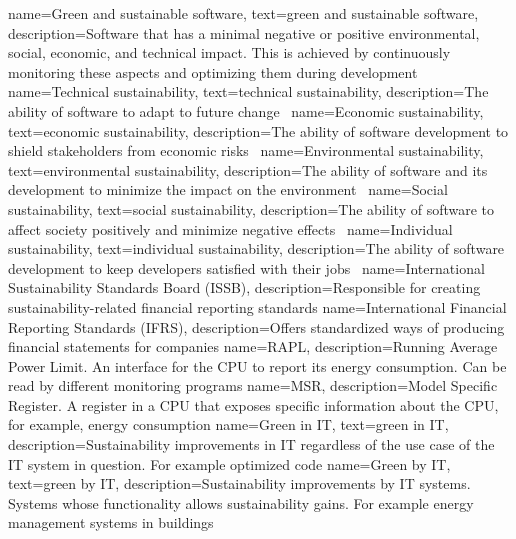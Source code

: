 {
    name=Green and sustainable software,
    text=green and sustainable software,
    description={Software that has a minimal negative or positive environmental, social, economic, and technical impact. This is achieved by continuously monitoring these aspects and optimizing them during development\cite{modelforselected}\cite{sustainabledevelopmentsustainablesoftware}}
}
{
    name=Technical sustainability,
    text=technical sustainability,
    description={The ability of software to adapt to future change~\cite{Calero2015}}
}
{
    name=Economic sustainability,
    text=economic sustainability,
    description={The ability of software development to shield stakeholders from economic risks~\cite{Calero2015}}
}
{
    name=Environmental sustainability,
    text=environmental sustainability,
    description={The ability of software and its development to minimize the impact on the environment~\cite{Calero2015}}
}
{
    name=Social sustainability,
    text=social sustainability,
    description={The ability of software to affect society positively and minimize negative effects~\cite{Calero2015}}
}
{
    name=Individual sustainability,
    text=individual sustainability,
    description={The ability of software development to keep developers satisfied with their jobs~\cite{Calero2015}}
}
{
    name=International Sustainability Standards Board (ISSB),
    description={Responsible for creating sustainability-related financial reporting standards}
}
{
    name=International Financial Reporting Standards (IFRS),
    description={Offers standardized ways of producing financial statements for companies}
}
{
    name=RAPL,
    description={Running Average Power Limit. An interface for the CPU to report its energy consumption. Can be read by different monitoring programs}
}
{
    name=MSR,
    description={Model Specific Register. A register in a CPU that exposes specific information about the CPU, for example, energy consumption}
}
{
    name=Green in IT,
    text=green in IT,
    description={Sustainability improvements in IT regardless of the use case of the IT system in question. For example optimized code}
}
{
    name=Green by IT,
    text=green by IT,
    description={Sustainability improvements by IT systems. Systems whose functionality allows sustainability gains. For example energy management systems in buildings}
}
